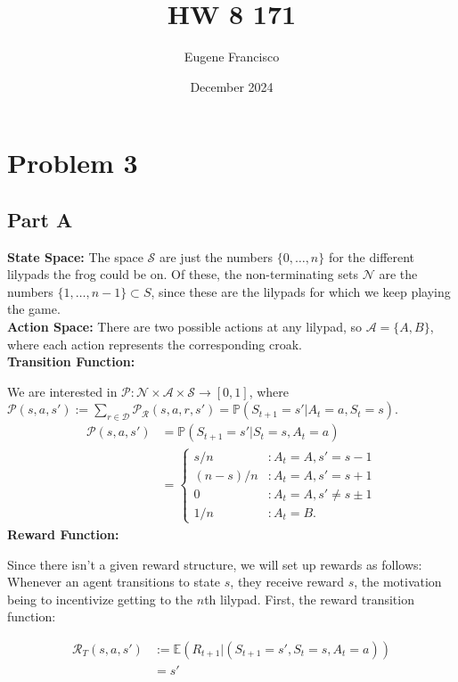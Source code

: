 \documentclass{article}
\title{HW 8 171}
\author{Eugene Francisco}
\date{December 2024}
\begin{document}
\maketitle

\section*{Problem 3}
\subsection*{Part A}
\textbf{State Space:}
The space $\mathcal{S}$ are just the numbers $\{0,\ldots, n\}$ for the different lilypads the frog could be on. Of these, the non-terminating sets $\mathcal{N}$ are the numbers $\{1,\ldots, n - 1\}\subset S$, since these are the lilypads for which we keep playing the game.\\

\noindent\textbf{Action Space:}
There are two possible actions at any lilypad, so $\mathcal{A} = \{A, B\}$, where each action represents the corresponding croak.\\

\noindent\textbf{Transition Function:}

We are interested in $\mathcal{P}: \mathcal{N} \times \mathcal{A} \times \mathcal{S}\to [0, 1]$, where $\mathcal{P}(s, a, s') := \sum_{r\in \mathcal{D}}\mathcal{P}_\mathcal{R}(s, a, r, s') = \mathbb{P}(S_{t+1} = s'| A_t = a, S_t = s)$.
\begin{align*}
	\mathcal{P}(s, a, s') &= \mathbb{P}(S_{t + 1} = s' | S_t = s, A_t = a)\\
	&=\begin{cases}
		s/n & : A_t = A, s' = s - 1\\
		(n - s)/n &: A_t = A, s' = s + 1\\
		0 &: A_t = A, s' \neq s\pm 1\\
		1/n &: A_t = B.
	\end{cases}
\end{align*}
\textbf{Reward Function:}

Since there isn't a given reward structure, we will set up rewards as follows: Whenever an agent transitions to state $s$, they receive reward $s$, the motivation being to incentivize getting to the $n$th lilypad. First, the reward transition function:

\begin{align*}
	\mathcal{R}_T(s, a, s') &:= \mathbb{E}(R_{t+1}| (S_{t + 1} = s', S_t = s, A_t = a))\\
	&= s'
\end{align*}
\end{document}

